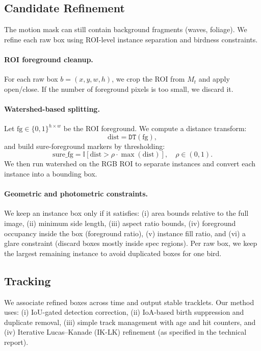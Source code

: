 \subsection{Candidate Refinement}
The motion mask can still contain background fragments (waves, foliage). We refine each raw box using ROI-level instance separation and birdness constraints.

\paragraph{ROI foreground cleanup.}
For each raw box $b=(x,y,w,h)$, we crop the ROI from $M_t$ and apply open/close. If the number of foreground pixels is too small, we discard it.

\paragraph{Watershed-based splitting.}
Let $\text{fg}\in\{0,1\}^{h\times w}$ be the ROI foreground. We compute a distance transform:
\begin{equation}
\text{dist}=\texttt{DT}(\text{fg}),
\end{equation}
and build sure-foreground markers by thresholding:
\begin{equation}
\text{sure\_fg}=\mathbb{I}\left[\text{dist} > \rho\cdot \max(\text{dist})\right],\quad \rho\in(0,1).
\end{equation}
We then run watershed on the RGB ROI to separate instances and convert each instance into a bounding box.

\paragraph{Geometric and photometric constraints.}
We keep an instance box only if it satisfies:
(i) area bounds relative to the full image,
(ii) minimum side length,
(iii) aspect ratio bounds,
(iv) foreground occupancy inside the box (foreground ratio),
(v) instance fill ratio,
and (vi) a glare constraint (discard boxes mostly inside spec regions).
Per raw box, we keep the largest remaining instance to avoid duplicated boxes for one bird.

\subsection{Tracking}
We associate refined boxes across time and output stable tracklets. Our method uses: (i) IoU-gated detection correction,
(ii) IoA-based birth suppression and duplicate removal, (iii) simple track management with age and hit counters, and (iv) Iterative Lucas--Kanade (IK-LK) refinement (as specified in the technical report).

